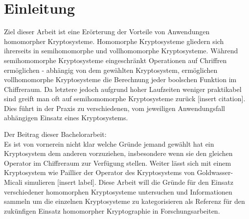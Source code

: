 \chapter{Einleitung}
Ziel dieser Arbeit ist eine Erörterung der Vorteile von Anwendungen homomorpher Kryptosysteme. Homomorphe Kryptosysteme gliedern sich ihrerseits in semihomomorphe und vollhomomorphe Kryptosysteme. Während semihomomorphe Kryptosysteme eingeschränkt Operationen auf Chriffren ermöglichen - abhängig von dem gewählten Kryptosystem, ermöglichen vollhomomorphe Kryptosysteme die Berechnung jeder boolschen Funktion im Chiffreraum. Da letztere jedoch aufgrund hoher Laufzeiten weniger praktikabel sind greift man oft auf semihomomorphe Kryptosysteme zurück  [insert citation]. Dies führt in der Praxis zu verschiedenen, vom jeweiligen Anwendungsfall abhängigen Einsatz eines Kryptosystems.

Der Beitrag dieser Bachelorarbeit:\\ Es ist von vornerein nicht klar welche Gründe jemand gewählt hat ein Kryptosystem dem anderen vorzuziehen, insbesondere wenn sie den gleichen Operator im Chiffreraum zur Verfügung stellen. Weiter lässt sich mit einem Kryptosystem wie Paillier der Operator des Kryptosystems von Goldwasser-Micali simulieren [insert label]. Diese Arbeit will die Gründe für den Einsatz verschiedener homomorphen Kryptosysteme untersuchen und Informationen sammeln um die einzelnen Kryptosysteme zu kategorisieren als Referenz für den zukünfigen Einsatz homomorpher Kryptographie in Forschungsarbeiten.

